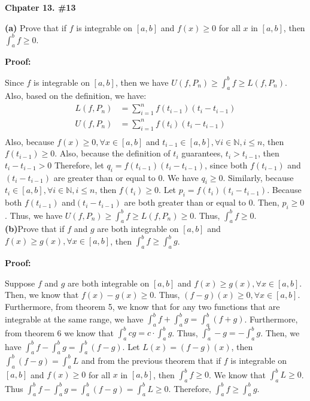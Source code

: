\documentclass[a4paper,12pt]{report}
\begin{document}
\noindent
\textbf{Chpater 13. \#13}

\noindent
\textbf{(a)} Prove that if $f$ is integrable on $[a,b]$ and $f(x)\geq 0$ for all $x$ in $[a,b]$, then $\int_{a}^{b}f\geq 0$. 

\noindent
\textbf{Proof: }

\noindent
Since $f$ is integrable on $[a,b]$, then we have $U(f,P_n)\geq \int_{a}^{b}f \geq L(f,P_n)$. Also, based on the definition, we have:
\begin{align*}
L(f,P_n)&=\sum_{i=1}^{n}f(t_{i-1})(t_i-t_{i-1})\\
U(f,P_n)&=\sum_{i=1}^{n}f(t_{i})(t_i-t_{i-1})\\
\end{align*}
Also, because $f(x)\geq 0, \forall x\in [a,b]$ and $t_{i-1}\in[a,b], \forall i\in \mathbb{N}, i\leq n$, then $f(t_{i-1})\geq 0$. Also, because the definition of $t_i$ guarantees, $t_i>t_{i-1}$, then $t_i-t_{i-1}>0$ Therefore, let $q_i=f(t_{i-1})(t_i-t_{i-1})$, since both $f(t_{i-1})$ and$(t_i-t_{i-1})$ are greater than or equal to $0$. We have $q_i\geq 0$. Similarly, because $t_i\in [a,b], \forall i\in \mathbb{N}, i\leq n$, then $f(t_i)\geq 0$. Let $p_i=f(t_{i})(t_i-t_{i-1})$. Because both $f(t_{i-1})$ and$(t_i-t_{i-1})$ are both greater than or equal to $0$. Then, $p_i\geq 0$. Thus, we have $U(f,P_n)\geq \int_{a}^{b}f \geq L(f,P_n)\geq 0$. Thus, $\int_{a}^{b}f \geq 0$.\\

\noindent
\textbf{(b)}Prove that if $f$ and $g$ are both integrable on $[a,b]$ and $f(x)\geq g(x), \forall x\in [a,b]$, then $\int_{a}^{b}f\geq \int_{a}^{b}g$. 

\noindent
\textbf{Proof:}

\noindent
Suppose $f$ and $g$ are both integrable on $[a,b]$ and $f(x)\geq g(x), \forall x\in [a,b]$. Then, we know that $f(x)-g(x)\geq 0$. Thus, $(f-g)(x)\geq 0, \forall x\in [a,b]$. Furthermore, from theorem 5, we know that for any two functions that are integrable at the same range, we have $\int_{a}^{b}f+\int_{a}^{b}g=\int_{a}^{b}(f+g)$. Furthermore, from theorem 6 we know that $\int_{a}^{b}cg=c\cdot{\int_{a}^{b}g}$. Thus, $\int_{a}^{b}-g=-\int_{a}^{b}g$. Then, we have $\int_{a}^{b}f-\int_{a}^{b}g=\int_{a}^{b}(f-g)$. Let $L(x)=(f-g)(x)$, then $\int_{a}^{b}(f-g)=\int_{a}^{b}L$ and from the previous theorem that if $f$ is integrable on $[a,b]$ and $f(x)\geq 0$ for all $x$ in $[a,b]$, then $\int_{a}^{b}f\geq 0$. We know that $\int_{a}^{b}L\geq 0$. Thus $\int_{a}^{b}f-\int_{a}^{b}g=\int_{a}^{b}(f-g)=\int_{a}^{b}L\geq 0$. Therefore, $\int_{a}^{b}f\geq \int_{a}^{b}g$.\\
\end{document}
